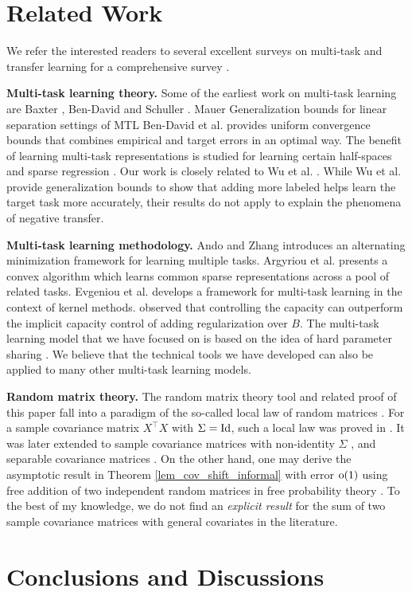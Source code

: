 \section{Related Work}


We refer the interested readers to several excellent surveys on multi-task and transfer learning for a comprehensive survey \cite{PY09,R17,ZY17,V20}.

\textbf{Multi-task learning theory.}
Some of the earliest work on multi-task learning are Baxter \cite{B00}, Ben-David and Schuller \cite{BS03}.
Mauer \cite{M06} Generalization bounds for linear separation settings of MTL
Ben-David et al. \cite{BBCK10} provides uniform convergence bounds that combines empirical and target errors in an optimal way.
The benefit of learning multi-task representations is studied for learning certain half-spaces \cite{MPR16} and sparse regression \cite{LPTV09,LPVT11}.
Our work is closely related to Wu et al. \cite{WZR20}.
While Wu et al. provide generalization bounds to show that adding more labeled helps learn the target task more accurately, their results do not apply to explain the phenomena of negative transfer.

\textbf{Multi-task learning methodology.}
Ando and Zhang \cite{AZ05} introduces an alternating minimization framework for learning multiple tasks.
Argyriou et al. \cite{AEP08} presents a convex algorithm which learns common sparse representations across a pool of related tasks.
Evgeniou et al. \cite{EMP05} develops a framework for multi-task learning in the context of kernel methods.
\cite{KD12} observed that controlling the capacity can outperform the implicit capacity control of adding regularization over $B$.
The multi-task learning model that we have focused on is based on the idea of hard parameter sharing \cite{C93,R17}.
We believe that the technical tools we have developed can also be applied to many other multi-task learning models.

\textbf{Random matrix theory.} The random matrix theory tool and related proof of this paper fall into a paradigm of the so-called local law of random matrices \cite{erdos2017dynamical}. For a sample covariance matrix $X^\top X$ with $\Sigma=\operatorname{Id}$, such a local law was proved in \cite{isotropic}. It was later extended to sample covariance matrices with non-identity $\Sigma$ \cite{Anisotropic}, and separable covariance matrices \cite{yang2019spiked}. On the other hand, one may derive the asymptotic result in Theorem \ref{lem_cov_shift_informal} with error $\operatorname{o}(1)$ using free addition of two independent random matrices in free probability theory \cite{nica2006lectures}. To the best of my knowledge, we do not find an {\it explicit result} for the sum of two sample covariance matrices with general covariates in the literature. 



\section{Conclusions and Discussions}
